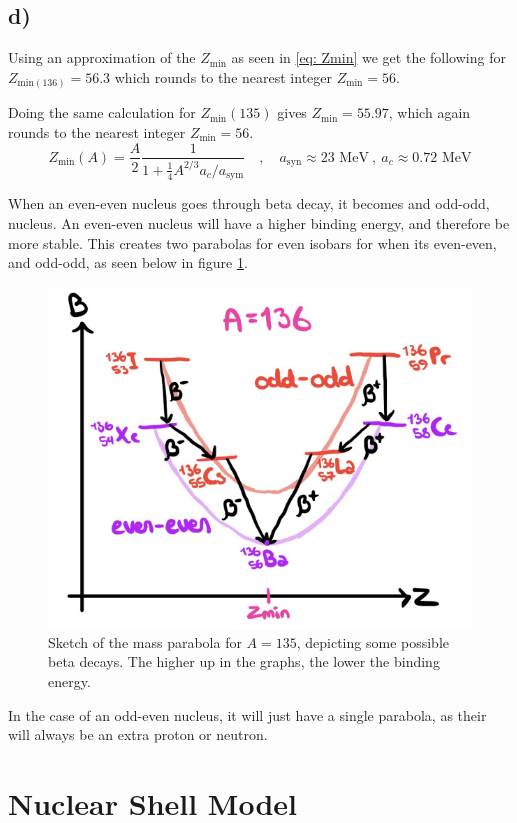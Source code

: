 \documentclass{article}
\begin{document}
\subsection*{d)}
Using an approximation of the $Z_{\text{min}}$ as seen in \cref{eq: Zmin} we get the following for $Z_{\text{min}(136)} = 56.3$ which rounds to the nearest integer $Z_{\text{min}} = 56$. 

Doing the same calculation for $Z_{\text{min}}(135)$ gives $Z_{\text{min}} = 55.97$, which again rounds to the nearest integer $Z_{\text{min}} = 56$. 
\begin{equation}\label{eq: Zmin}
Z_{\text{min}}(A) = \frac{A}{2} \frac{1}{1 + \frac{1}{4}A^{2 / 3}a_c / a_{\text{sym}}} \quad , \quad  a_{\text{syn}} ≈ 23 \text{ MeV} \ , \ a_c ≈ 0.72 \text{ MeV}
\end{equation}

When an even-even nucleus goes through beta decay, it becomes and odd-odd, nucleus. An even-even nucleus will have a higher binding energy, and therefore be more stable. This creates two parabolas for even isobars for when its even-even, and odd-odd, as seen below in figure \ref{fig: mass_parabola}.

\begin{figure}[h!]
\centering
\includegraphics[width = .65\textwidth]{mass_parabola.png}
\caption{Sketch of the mass parabola for $A = 135$, depicting some possible beta decays. The higher up in the graphs, the lower the binding energy.}
\label{fig: mass_parabola}
\end{figure}

In the case of an odd-even nucleus, it will just have a single parabola, as their will always be an extra proton or neutron. 


\section{Nuclear Shell Model}
\end{document}
